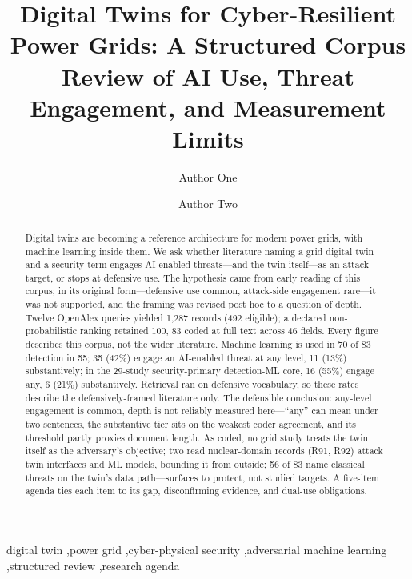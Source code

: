 \documentclass[preprint,12pt]{elsarticle}
\renewcommand{\_}{\plainunderscore\allowbreak}
\begin{document}
\begin{frontmatter}

\title{Digital Twins for Cyber-Resilient Power Grids: A Structured Corpus
Review of AI Use, Threat Engagement, and Measurement Limits}

\author[1]{Author One}
\author[1]{Author Two}


\begin{abstract}
Digital twins are becoming a reference architecture for modern power grids, with machine
learning inside them. We ask whether literature naming a grid digital twin and a
security term engages AI-enabled threats---and the twin itself---as an attack target, or
stops at defensive use. The hypothesis came from early reading of this corpus; in its
original form---defensive use common, attack-side engagement rare---it was not supported,
and the framing was revised post hoc to a question of depth.
Twelve OpenAlex queries yielded 1{,}287 records (492 eligible); a declared
non-probabilistic ranking retained 100, 83 coded at full text across 46 fields.
Every figure describes this corpus, not the wider literature.
Machine learning is used in 70 of 83---detection in 55; 35 (42\%) engage an AI-enabled
threat at any level, 11 (13\%) substantively; in the 29-study security-primary
detection-ML core, 16 (55\%) engage any, 6 (21\%) substantively. Retrieval ran on
defensive vocabulary, so these rates describe the defensively-framed literature only. The
defensible conclusion: any-level engagement is common, depth is not reliably
measured here---``any'' can mean under two sentences, the substantive tier sits on the
weakest coder agreement, and its threshold partly proxies document length.
As coded, no grid study treats the twin itself as the adversary's objective; two read
nuclear-domain records (R91, R92) attack twin interfaces and ML models, bounding it
from outside; 56 of 83 name classical threats on the twin's data path---surfaces to
protect, not studied targets. A five-item agenda ties each item to its gap, disconfirming
evidence, and dual-use obligations.
\end{abstract}

\begin{keyword}
digital twin \sep power grid \sep cyber-physical security \sep adversarial machine learning
\sep structured review \sep research agenda
\end{keyword}

\end{frontmatter}
\end{document}
